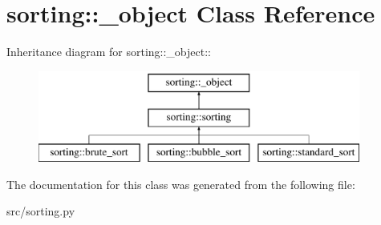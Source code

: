 \hypertarget{classsorting_1_1__object}{
\section{sorting::\_\-object Class Reference}
\label{da/d16/classsorting_1_1__object}
}
Inheritance diagram for sorting::\_\-object::\begin{figure}[H]
\begin{center}
\leavevmode
\includegraphics[height=3cm]{da/d16/classsorting_1_1__object}
\end{center}
\end{figure}


The documentation for this class was generated from the following file:\begin{DoxyCompactItemize}
\item 
src/sorting.py\end{DoxyCompactItemize}

